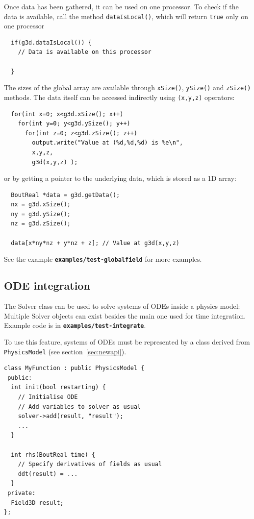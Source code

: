 \documentclass[12pt]{article}
\newcommand{\code}[1]{\texttt{#1}}
\newcommand{\file}[1]{\texttt{\bf #1}}
\begin{document}
Once data has been gathered, it can be used on one processor. To check if the data is available, call
the method \lstinline!dataIsLocal()!, which will return \lstinline!true! only on one processor
\begin{lstlisting}
  if(g3d.dataIsLocal()) {
    // Data is available on this processor
    
  }
\end{lstlisting}
The sizes of the global array are available through \lstinline!xSize()!, \lstinline!ySize()! and \lstinline!zSize()!
methods. The data itself can be accessed indirectly using \lstinline!(x,y,z)! operators:
\begin{lstlisting}
  for(int x=0; x<g3d.xSize(); x++)
    for(int y=0; y<g3d.ySize(); y++)
      for(int z=0; z<g3d.zSize(); z++)
        output.write("Value at (%d,%d,%d) is %e\n", 
        x,y,z, 
        g3d(x,y,z) );
\end{lstlisting}
or by getting a pointer to the underlying data, which is stored as a 1D array:
\begin{lstlisting}
  BoutReal *data = g3d.getData();
  nx = g3d.xSize();
  ny = g3d.ySize();
  nz = g3d.zSize();
 
  data[x*ny*nz + y*nz + z]; // Value at g3d(x,y,z)
\end{lstlisting}

See the example \file{examples/test-globalfield} for more examples.

\subsection{ODE integration}

The Solver class can be used to solve systems of ODEs inside a physics model: Multiple Solver objects
can exist besides the main one used for time integration.
Example code is in \file{examples/test-integrate}.

To use this feature, systems of ODEs must be represented by a class derived
from \code{PhysicsModel} (see section~\ref{sec:newapi}).

\begin{lstlisting}
class MyFunction : public PhysicsModel {
 public:
  int init(bool restarting) {
    // Initialise ODE
    // Add variables to solver as usual
    solver->add(result, "result");
    ...
  }
  
  int rhs(BoutReal time) {
    // Specify derivatives of fields as usual
    ddt(result) = ...
  }
 private:
  Field3D result;
};
\end{lstlisting}
\end{document}
